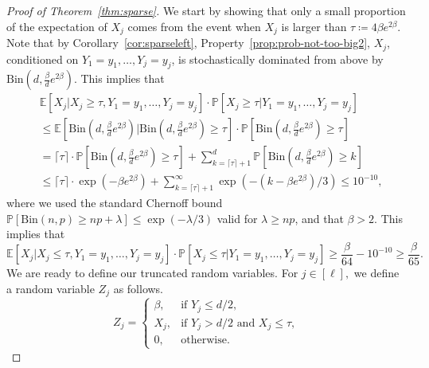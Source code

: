 \documentclass[10pt]{amsart}
\theoremstyle{definition}
\newcommand{\mbE}{\mathbb{E}}
\newcommand{\Bin}{\mathrm{Bin}}
\renewcommand{\Pr}{\mathbb{P}}
\begin{document}
\begin{proof}[Proof of Theorem~\ref{thm:sparse}]
    We start by showing that only a small proportion of the expectation of $X_j$ comes from the event when $X_j$ is larger than $\tau \coloneqq 4 \beta e^{2\beta}$. Note that by Corollary~\ref{cor:sparseleft}, Property~\ref{prop:prob-not-too-big2}, $X_j$, conditioned on $Y_1=y_1,\ldots,Y_j=y_j$, is stochastically dominated from above by $\Bin\left(d, \frac{\beta}{d} e^{2 \beta}\right)$. This implies that
    \begin{align*} &\mbE[X_j \vert X_j \ge \tau, Y_1=y_1,\ldots,Y_j=y_j] \cdot \Pr[X_j \ge \tau|Y_1=y_1,\ldots,Y_j=y_j]\\ &\le \mathbb{E}\left[\Bin\left(d, \frac{\beta}{d} e^{2 \beta}\right)\bigg\vert \Bin\left(d, \frac{\beta}{d} e^{2 \beta}\right)\ge \tau\right] \cdot \mathbb{P}\left[\Bin\left(d, \frac{\beta}{d} e^{2 \beta}\right)\ge \tau\right]\\ &= \lceil\tau\rceil \cdot \Pr\left[\Bin\left(d, \frac{\beta}{d} e^{2\beta}\right) \ge \tau\right] + \sum_{k = \lceil\tau\rceil + 1}^{d} \Pr\left[\Bin\left(d, \frac{\beta}{d} e^{2\beta}\right) \ge k\right]\\ &\le \lceil\tau\rceil \cdot \exp(- \beta e^{2\beta}) + \sum_{k=\lceil\tau\rceil+1}^\infty \exp( -(k - \beta e^{2\beta})/ 3) \le 10^{-10},
    \end{align*} 
    where we used the standard Chernoff bound $\Pr[\Bin(n, p) \ge np + \lambda] \le \exp(-\lambda / 3)$ valid for $\lambda \ge np$, and that $\beta>2$. This implies that
    $$\mbE[X_j \vert X_j \le \tau,Y_1=y_1,\ldots,Y_j=y_j] \cdot \Pr[X_j \le \tau|Y_1=y_1,\ldots,Y_j=y_j] \ge \frac{\beta}{64}-10^{-10}\ge  \frac{\beta}{65}.$$
    We are ready to define our truncated random variables. For $j \in [\ell],$ we define a random variable $Z_j$ as follows.
    \[ Z_j = \begin{cases} 
        \beta, &\text{if } Y_j \le d/2,\\
        X_j, &\text{if } Y_j > d/2 \text{ and } X_j \le \tau,\\
        0, &\text{otherwise.}        
    \end{cases}
    \]


\end{proof}
\end{document}

